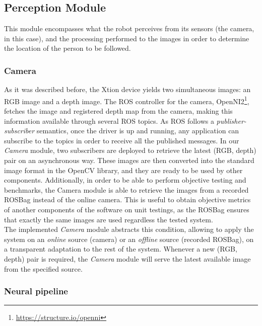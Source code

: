 \subsection{Perception Module}
This module encompasses what the robot perceives from its sensors (the camera, in this case), and the processing performed to the images in order to determine the location of the person to be followed.
\subsubsection{Camera}
As it was described before, the Xtion device yields two simultaneous images: an RGB image and a depth image. The ROS controller for the camera, OpenNI2\footnote{\url{https://structure.io/openni}}, fetches the image and registered depth map from the camera, making this information available through several ROS topics. As ROS follows a \textit{publisher-subscriber} semantics, once the driver is up and running, any application can subscribe to the topics in order to receive all the published messages. In our \textit{Camera} module, two subscribers are deployed to retrieve the latest (RGB, depth) pair on an asynchronous way. These images are then converted into the standard image format in the OpenCV library, and they are ready to be used by other components. Additionally, in order to be able to perform objective testing and benchmarks, the Camera module is able to retrieve the images from a recorded ROSBag instead of the online camera. This is useful to obtain objective metrics of another components of the software on unit testings, as the ROSBag ensures that exactly the same images are used regardless the tested system.\\

The implemented \textit{Camera} module abstracts this condition, allowing to apply the system on an \textit{online} source (camera) or an \textit{offline} source (recorded ROSBag), on a transparent adaptation to the rest of the system. Whenever a new (RGB, depth) pair is required, the \textit{Camera} module will serve the latest available image from the specified source.\\

\subsubsection{Neural pipeline}

